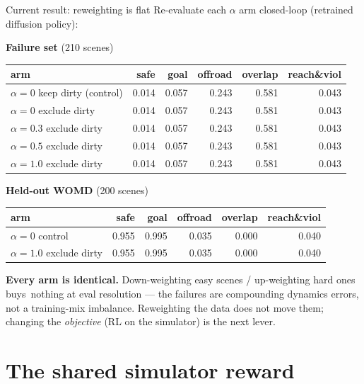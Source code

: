 \begin{frame}{Current result: reweighting is flat}
  \small
  Re-evaluate each $\alpha$ arm closed-loop (retrained diffusion policy):
  \begin{center}
  \textbf{Failure set} (210 scenes)\\[2pt]
  \begin{tabular}{@{}lrrrrr@{}}
    \toprule
    arm & safe & goal & offroad & overlap & reach\&viol \\
    \midrule
    $\alpha=0$ keep dirty (control) & 0.014 & 0.057 & 0.243 & 0.581 & 0.043 \\
    $\alpha=0$ exclude dirty        & 0.014 & 0.057 & 0.243 & 0.581 & 0.043 \\
    $\alpha=0.3$ exclude dirty      & 0.014 & 0.057 & 0.243 & 0.581 & 0.043 \\
    $\alpha=0.5$ exclude dirty      & 0.014 & 0.057 & 0.243 & 0.581 & 0.043 \\
    $\alpha=1.0$ exclude dirty      & 0.014 & 0.057 & 0.243 & 0.581 & 0.043 \\
    \bottomrule
  \end{tabular}

  \vspace{0.6em}
  \textbf{Held-out WOMD} (200 scenes)\\[2pt]
  \begin{tabular}{@{}lrrrrr@{}}
    \toprule
    arm & safe & goal & offroad & overlap & reach\&viol \\
    \midrule
    $\alpha=0$ control      & 0.955 & 0.995 & 0.035 & 0.000 & 0.040 \\
    $\alpha=1.0$ exclude dirty & 0.955 & 0.995 & 0.035 & 0.000 & 0.040 \\
    \bottomrule
  \end{tabular}
  \end{center}
  \textbf{Every arm is identical.} Down-weighting easy scenes / up-weighting hard
  ones buys \bad{}\,nothing at eval resolution --- the failures are compounding
  dynamics errors, not a training-mix imbalance. Reweighting the data does not
  move them; changing the \emph{objective} (RL on the simulator) is the next lever.
\end{frame}

\section{The shared simulator reward}

